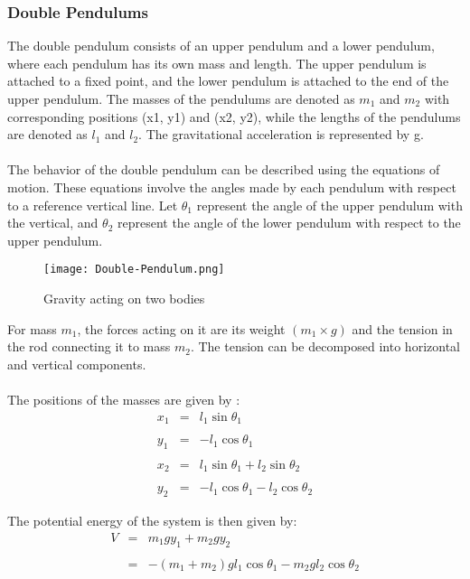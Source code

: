 \documentclass[12pt]{article}
\begin{document}
\newpage
\subsubsection{Double Pendulums}
The double pendulum consists of an upper pendulum and a lower pendulum, where each pendulum has its own mass and length. The upper pendulum is attached to a fixed point, and the lower pendulum is attached to the end of the upper pendulum. The masses of the pendulums are denoted as $m_1$ and $m_2$ with corresponding positions (x1, y1) and (x2, y2), while the lengths of the pendulums are denoted as $l_1$ and $l_2$. The gravitational acceleration is represented by g.
\\\\
The behavior of the double pendulum can be described using the equations of motion. These equations involve the angles made by each pendulum with respect to a reference vertical line. Let $\theta_1$ represent the angle of the upper pendulum with the vertical, and $\theta_2$ represent the angle of the lower pendulum with respect to the upper pendulum.

\begin{figure}[!htb]
  \centering
  \texttt{[image: Double-Pendulum.png]}
  \caption{Gravity acting on two bodies}\label{Fig:Figure 11}
\end{figure}

For mass $m_1$, the forces acting on it are its weight $(m_1 \times g)$ and the tension in the rod connecting it to mass $m_2$. The tension can be decomposed into horizontal and vertical components.
\\\\


The positions of the masses are given by \cite{scienceworld}:
\begin{eqnarray}
    x_1 &=& l_1\sin\theta_1 \\
    \nonumber \\
    y_1 &=& -l_1\cos\theta_1 \\
    \nonumber \\
    x_2 &=& l_1\sin\theta_1 + l_2\sin\theta_2 \\
    \nonumber \\
    y_2 &=& -l_1\cos\theta_1 - l_2\cos\theta_2 
\end{eqnarray}

The potential energy of the system is then given by:
\begin{eqnarray}
    V &=& m_1gy_1 + m_2gy_2 \\
    \nonumber \\
      &=& -(m_1 + m_2)gl_1\cos\theta_1 - m_2gl_2\cos\theta_2
\end{eqnarray}
\end{document}
